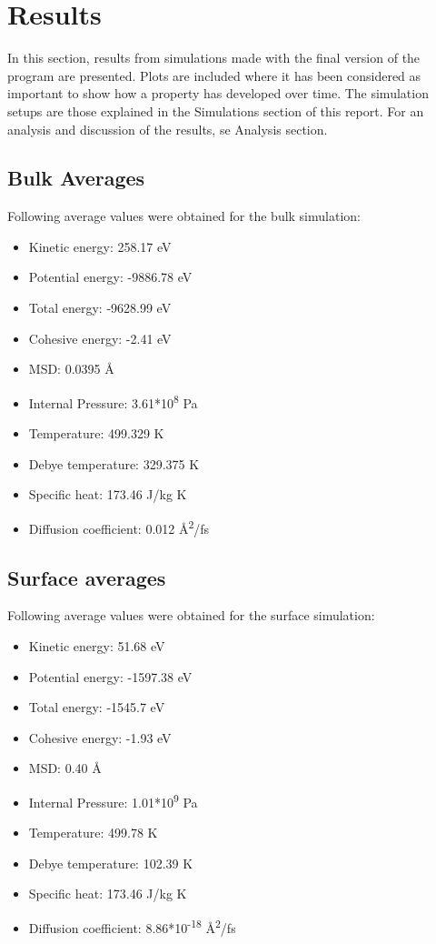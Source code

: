\section{Results}
In this section, results from simulations made with the final version of the program are presented. Plots are included where it has been considered as important to show how a property has developed over time. The simulation setups are those explained in the Simulations section of this report. For an analysis and discussion of the results, se Analysis section.
\subsection{Bulk Averages}

Following average values were obtained for the bulk simulation:
\begin{itemize}
	\item Kinetic energy: 258.17 eV
	\item Potential energy: -9886.78 eV
	\item Total energy: -9628.99 eV
	\item Cohesive energy: -2.41 eV
	\item MSD: 0.0395 Å
	\item Internal Pressure: 3.61*10\textsuperscript{8} Pa
	\item Temperature: 499.329 K
	\item Debye temperature: 329.375 K
	\item Specific heat: 173.46 J/kg K
	\item Diffusion coefficient: 0.012 Å\textsuperscript{2}/fs
\end{itemize}

\subsection{Surface averages}
Following average values were obtained for the surface simulation:
\begin{itemize}
	\item Kinetic energy: 51.68 eV
	\item Potential energy: -1597.38 eV
	\item Total energy: -1545.7 eV
	\item Cohesive energy: -1.93 eV
	\item MSD: 0.40 Å
	\item Internal Pressure: 1.01*10\textsuperscript{9} Pa
	\item Temperature: 499.78 K
	\item Debye temperature: 102.39 K
	\item Specific heat: 173.46 J/kg K
	\item Diffusion coefficient: 8.86*10\textsuperscript{-18} Å\textsuperscript{2}/fs
\end{itemize}

